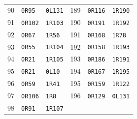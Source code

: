\begin{longtable}{@{}r ll @{\qquad} r ll@{}}
90 & \texttt{0R95} & \texttt{0L131} & 189 & \texttt{0R116} & \texttt{1R190} \\
91 & \texttt{0R102} & \texttt{1R103} & 190 & \texttt{0R191} & \texttt{1R192} \\
92 & \texttt{0R67} & \texttt{1R56} & 191 & \texttt{0R168} & \texttt{1R78} \\
93 & \texttt{0R55} & \texttt{1R104} & 192 & \texttt{0R158} & \texttt{1R193} \\
94 & \texttt{0R21} & \texttt{1R105} & 193 & \texttt{0R186} & \texttt{1R191} \\
95 & \texttt{0R21} & \texttt{0L10} & 194 & \texttt{0R167} & \texttt{1R195} \\
96 & \texttt{0R59} & \texttt{1R41} & 195 & \texttt{0R159} & \texttt{1R122} \\
97 & \texttt{0R106} & \texttt{1R8} & 196 & \texttt{0R129} & \texttt{0L131} \\
98 & \texttt{0R91} & \texttt{1R107} &  &  &  \\
\bottomrule
\end{longtable}
